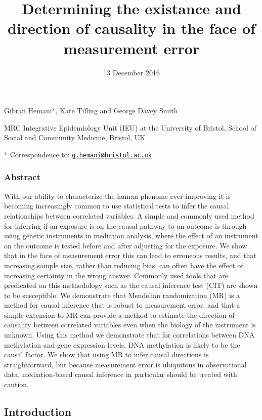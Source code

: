 \documentclass[]{article}
\title{Determining the existance and direction of causality in the face of
measurement error}
\author{}
\date{13 December 2016}
\begin{document}
\maketitle

Gibran Hemani*, Kate Tilling and George Davey Smith

MRC Integrative Epidemiology Unit (IEU) at the University of Bristol,
School of Social and Community Medicine, Bristol, UK

* Correspondence to:
\href{mailto:g.hemani@bristol.ac.uk}{\nolinkurl{g.hemani@bristol.ac.uk}}

\subsubsection{Abstract}\label{abstract}

With our ability to characterize the human phenome ever improving it is
becoming increasingly common to use statistical tests to infer the
causal relationships between correlated variables. A simple and commonly
used method for inferring if an exposure is on the causal pathway to an
outcome is through using genetic instruments in mediation analysis,
where the effect of an instrument on the outcome is tested before and
after adjusting for the exposure. We show that in the face of
measurement error this can lead to erroneous results, and that
increasing sample size, rather than reducing bias, can often have the
effect of increasing certainty in the wrong answer. Commonly used tools
that are predicated on this methodology such as the causal inference
test (CIT) are shown to be susceptible. We demonstrate that Mendelian
randomization (MR) is a method for causal inference that is robust to
measurement error, and that a simple extension to MR can provide a
method to estimate the direction of causality between correlated
variables even when the biology of the instrument is unknown. Using this
method we demonstrate that for correlations between DNA methylation and
gene expression levels, DNA methylation is likely to be the causal
factor. We show that using MR to infer causal directions is
straightforward, but because measurement error is ubiquitous in
observational data, mediation-based causal inference in particular
should be treated with caution.

\subsection{Introduction}\label{introduction}
\end{document}
